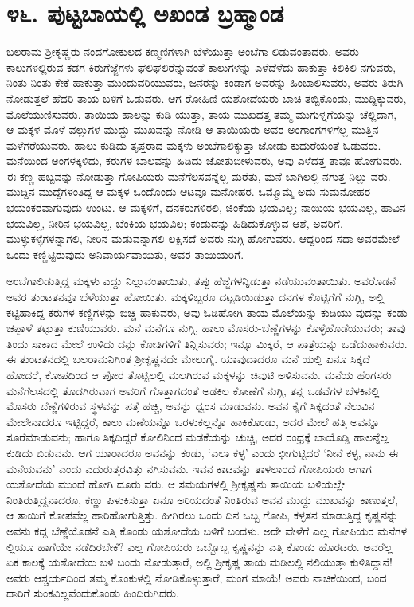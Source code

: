
\chapter{೪೬. ಪುಟ್ಟಬಾಯಲ್ಲಿ ಅಖಂಡ ಬ್ರಹ್ಮಾಂಡ}

ಬಲರಾಮ ಶ್ರೀಕೃಷ್ಣರು ನಂದಗೋಕುಲದ ಕಣ್ಮಣಿಗಳಾಗಿ ಬೆಳೆಯುತ್ತಾ ಅಂಬೆಗಾ ಲಿಡುವಂತಾದರು. ಅವರು ಕಾಲುಗಳಲ್ಲಿರುವ ಕಡಗ ಕಿರುಗೆಜ್ಜೆಗಳು ಘಲಿಘಲಿರೆನ್ನುವಂತೆ ಕಾಲುಗಳನ್ನು ಎಳೆದೆಳೆದು ಹಾಕುತ್ತಾ ಕಿಲಿಕಿಲಿ ನಗುವರು, ನಿಂತು ನಿಂತು ಕೇಕೆ ಹಾಕುತ್ತಾ ಮುಂದುವರಿಯುವರು, ಜನರನ್ನು ಕಂಡಾಗ ಅವರನ್ನು ಹಿಂಬಾಲಿಸುವರು, ಅವರು ತಿರುಗಿ ನೋಡುತ್ತಲೆ ಹೆದರಿ ತಾಯ ಬಳಿಗೆ ಓಡುವರು. ಆಗ ರೋಹಿಣಿ ಯಶೋದೆಯರು ಬಾಚಿ ತಬ್ಬಿಕೊಂಡು, ಮುದ್ದಿಕ್ಕುವರು, ಮೊಲೆಯುಣಿಸುವರು. ತಾಯಿಯ ಹಾಲನ್ನು ಕುಡಿ ಯುತ್ತಾ, ತಾಯ ಮುಖದತ್ತ ತಮ್ಮ ಮುಗುಳ್ನಗೆಯನ್ನು ಚೆಲ್ಲಿದಾಗ, ಆ ಮಕ್ಕಳ ಮೊಳೆ ವಲ್ಲುಗಳ ಮುದ್ದು ಮುಖವನ್ನು ನೋಡಿ ಆ ತಾಯಿಯರು ಅವರ ಅಂಗಾಂಗಗಳಿಗೆಲ್ಲ ಮುತ್ತಿನ ಮಳೆಗರೆಯುವರು. ಹಾಲು ಕುಡಿದು ತೃಪ್ತರಾದ ಮಕ್ಕಳು ಅಂಬೆಗಾಲಿಕ್ಕುತ್ತಾ ಜೋಡು ಕುದುರೆಯಂತೆ ಓಡುವರು. ಮನೆಯಿಂದ ಅಂಗಳಕ್ಕಿಳಿದು, ಕರುಗಳ ಬಾಲವನ್ನು ಹಿಡಿದು ಜೋತುಬೀಳುವರು, ಅವು ಎಳೆದತ್ತ ತಾವೂ ಹೋಗುವರು. ಈ ಕಣ್ಣ ಹಬ್ಬವನ್ನು ನೋಡುತ್ತಾ ಗೋಪಿಯರು ಮನೆಗೆಲಸವನ್ನೆಲ್ಲ ಮರೆತು, ಮನೆ ಬಾಗಿಲಲ್ಲಿ ನಗುತ್ತ ನಿಲ್ಲು ವರು. ಮುದ್ದಿನ ಮುದ್ದೆಗಳಂತಿದ್ದ ಆ ಮಕ್ಕಳ ಒಂದೊಂದು ಆಟವೂ ಮನೋಹರ. ಒಮ್ಮೊಮ್ಮೆ ಅದು ಸುಮನೋಹರ ಭಯಂಕರವಾಗುವುದು ಉಂಟು. ಆ ಮಕ್ಕಳಿಗೆ, ದನಕರುಗಳಿರಲಿ, ಜಿಂಕೆಯ ಭಯವಿಲ್ಲ; ನಾಯಿಯ ಭಯವಿಲ್ಲ, ಹಾವಿನ ಭಯವಿಲ್ಲ, ನೀರಿನ ಭಯವಿಲ್ಲ, ಬೆಂಕಿಯ ಭಯವಿಲ; ಕಂಡುದನ್ನು ಹಿಡಿದುಕೊಳ್ಳುವ ಆಶೆ, ಅವರಿಗೆ. ಮುಳ್ಳುಕಳ್ಳೆಗಳನ್ನಾಗಲಿ, ನೀರಿನ ಮಡುವನ್ನಾಗಲಿ ಲಕ್ಷಿಸದೆ ಅವರು ನುಗ್ಗಿ ಹೋಗುವರು. ಆದ್ದರಿಂದ ಸದಾ ಅವರಮೇಲೆ ಒಂದು ಕಣ್ಣಿಟ್ಟಿರುವುದು ಅನಿವಾರ್ಯವಾಯಿತು, ಅವರ ತಾಯಿಯರಿಗೆ.

ಅಂಬೆಗಾಲಿಡುತ್ತಿದ್ದ ಮಕ್ಕಳು ಎದ್ದು ನಿಲ್ಲುವಂತಾಯಿತು, ತಪ್ಪು ಹೆಜ್ಜೆಗಳನ್ನಿಡುತ್ತಾ ನಡೆಯುವಂತಾಯಿತು. ಅವರೊಡನೆ ಅವರ ತುಂಟತನವೂ ಬೆಳೆಯುತ್ತಾ ಹೋಯಿತು. ಮಕ್ಕಳಿಬ್ಬರೂ ದಟ್ಟಡಿಯಿಡುತ್ತಾ ದನಗಳ ಕೊಟ್ಟಿಗೆಗೆ ನುಗ್ಗಿ, ಅಲ್ಲಿ ಕಟ್ಟಿಹಾಕಿದ್ದ ಕರುಗಳ ಕಣ್ಣಿಗಳನ್ನು ಬಿಚ್ಚಿ ಹಾಕುವರು, ಅವು ಓಡಿಹೋಗಿ ತಾಯ ಮೊಲೆಯನ್ನು ಕುಡಿಯು ವುದನ್ನು ಕಂಡು ಚಪ್ಪಾಳೆ ತಟ್ಟುತ್ತಾ ಕುಣಿಯುವರು. ಮನೆ ಮನೆಗೂ ನುಗ್ಗಿ, ಹಾಲು ಮೊಸರು-ಬೆಣ್ಣೆಗಳನ್ನು ಕೊಳ್ಳೆಹೊಡೆಯುವರು; ತಾವು ತಿಂದು ಸಾಕಾದ ಮೇಲೆ ಉಳಿದು ದನ್ನು ಕೋತಿಗಳಿಗೆ ತಿನ್ನಿಸುವರು; ಇನ್ನೂ ಮಿಕ್ಕರೆ, ಆ ಪಾತ್ರೆಯನ್ನು ಒಡೆದುಹಾಕುವರು. ಈ ತುಂಟತನದಲ್ಲಿ ಬಲರಾಮನಿಗಿಂತ ಶ್ರೀಕೃಷ್ಣನದೇ ಮೇಲುಗೈ. ಯಾವುದಾದರೂ ಮನೆ ಯಲ್ಲಿ ಏನೂ ಸಿಕ್ಕದೆ ಹೋದರೆ, ಕೋಪದಿಂದ ಆ ಪೋರ ತೊಟ್ಟಿಲಲ್ಲಿ ಮಲಗಿರುವ ಮಕ್ಕಳನ್ನು ಚಿವುಟಿ ಅಳಿಸುವನು. ಮನೆಯ ಹೆಂಗಸರು ಮನೆಗೆಲಸದಲ್ಲಿ ತೊಡಗಿರುವಾಗ ಅವರಿಗೆ ಗೊತ್ತಾಗದಂತೆ ಅಡಕಿಲ ಕೋಣೆಗೆ ನುಗ್ಗಿ, ತನ್ನ ಒಡವೆಗಳ ಬೆಳಕಿನಲ್ಲಿ ಮೊಸರು ಬೆಣ್ಣೆಗಳಿರುವ ಸ್ಥಳವನ್ನು ಪತ್ತೆ ಹಚ್ಚಿ, ಅವನ್ನು ಧ್ವಂಸ ಮಾಡುವನು. ಅವನ ಕೈಗೆ ಸಿಕ್ಕದಂತೆ ನೆಲುವಿನ ಮೇಲೇನಾದರೂ ಇಟ್ಟಿದ್ದರೆ, ಕಾಲು ಮಣೆಯನ್ನೊ ಒರಳುಕಲ್ಲನ್ನೊ ಹಾಕಿಕೊಂಡು, ಅದರ ಮೇಲೆ ಹತ್ತಿ ಅವನ್ನೂ ಸೂರೆಮಾಡುವನು; ಹಾಗೂ ಸಿಕ್ಕದಿದ್ದರೆ ಕೋಲಿನಿಂದ ಮಡಕೆಯನ್ನು ಚುಚ್ಚಿ, ಅದರ ರಂಧ್ರಕ್ಕೆ ಬಾಯೊಡ್ಡಿ ಹಾಲನ್ನೆಲ್ಲ ಕುಡಿದು ಬಿಡುವನು. ಆಗ ಯಾರಾದರೂ ಅವನನ್ನು ಕಂಡು, ‘ಎಲಾ ಕಳ್ಳ’ ಎಂದು ಛೀಗುಟ್ಟಿದರೆ ‘ನೀನೆ ಕಳ್ಳ, ನಾನು ಈ ಮನೆಯವನು’ ಎಂದು ಎದುರುತ್ತರವಿತ್ತು ನಗಿಸುವನು. ಇವನ ಕಾಟವನ್ನು ತಾಳಲಾರದೆ ಗೋಪಿಯರು ಆಗಾಗ ಯಶೋದೆಯ ಮುಂದೆ ಹೋಗಿ ದೂರು ವರು. ಆ ಸಮಯಗಳಲ್ಲಿ ಶ್ರೀಕೃಷ್ಣನು ತಾಯಿಯ ಬಳಿಯಲ್ಲೇ ನಿಂತಿರುತ್ತಿದ್ದನಾದರೂ, ಕಣ್ಣು ಪಿಳುಕಿಸುತ್ತಾ ಏನೂ ಅರಿಯದಂತೆ ನಿಂತಿರುವ ಅವನ ಮುದ್ದು ಮುಖವನ್ನು ಕಾಣುತ್ತಲೆ, ಆ ತಾಯಿಗೆ ಕೋಪವೆಲ್ಲ ಹಾರಿಹೋಗುತ್ತಿತ್ತು. ಹೀಗಿರಲು ಒಂದು ದಿನ ಒಬ್ಬ ಗೋಪಿ, ಕಳ್ಳತನ ಮಾಡುತ್ತಿದ್ದ ಕೃಷ್ಣನನ್ನು ಅವನು ಕದ್ದ ಬೆಣ್ಣೆಯೊಡನೆ ಎತ್ತಿ ಕೊಂಡು ಯಶೋದೆಯ ಬಳಿಗೆ ಬಂದಳು. ಅದೇ ವೇಳೆಗೆ ಎಲ್ಲ ಗೋಪಿಯರ ಮನೆಗಳ ಲ್ಲಿಯೂ ಹಾಗೆಯೇ ನಡೆದಿರಬೇಕೆ? ಎಲ್ಲ ಗೋಪಿಯರು ಒಬ್ಬೊಬ್ಬ ಕೃಷ್ಣನನ್ನು ಎತ್ತಿ ಕೊಂಡು ಹೊರಟರು. ಅವರೆಲ್ಲ ಏಕ ಕಾಲಕ್ಕೆ ಯಶೋದೆಯ ಬಳಿ ಬಂದು ನೋಡುತ್ತಾರೆ, ಅಲ್ಲಿ ಶ್ರೀಕೃಷ್ಣ ತಾಯ ಮಡಿಲಲ್ಲಿ ನಲಿಯುತ್ತಾ ಕುಳಿತಿದ್ದಾನೆ! ಅವರು ಆಶ್ಚರ್ಯದಿಂದ ತಮ್ಮ ಕೊಂಕುಳಲ್ಲಿ ನೋಡಿಕೊಳ್ಳುತ್ತಾರೆ, ಮಂಗ ಮಾಯೆ! ಅವರು ನಾಚಿಕೆಯಿಂದ, ಬಂದ ದಾರಿಗೆ ಸುಂಕವಿಲ್ಲವೆಂದುಕೊಂಡು ಹಿಂದಿರುಗಿದರು.

